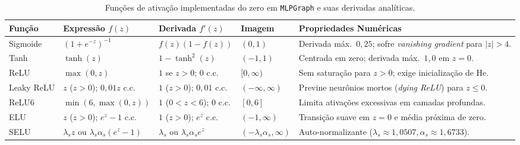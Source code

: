 \begin{table}[H]
\centering
\caption{Funções de ativação implementadas do zero em \texttt{MLPGraph} e suas derivadas analíticas.}
\label{tab:ativacoes}
\footnotesize
\begin{tabular}{llllp{5.8cm}}
\toprule
\textbf{Função} & \textbf{Expressão $f(z)$} & \textbf{Derivada $f'(z)$} & \textbf{Imagem} & \textbf{Propriedades Numéricas} \\
\midrule
Sigmoide & $(1 + e^{-z})^{-1}$ & $f(z)(1-f(z))$ & $(0,1)$ & Derivada máx.\ $0{,}25$; sofre \textit{vanishing gradient} para $|z|>4$. \\
Tanh & $\tanh(z)$ & $1 - \tanh^2(z)$ & $(-1,1)$ & Centrada em zero; derivada máx.\ $1{,}0$ em $z=0$. \\
ReLU & $\max(0,z)$ & $1$ se $z>0$; $0$ c.c. & $[0,\infty)$ & Sem saturação para $z>0$; exige inicialização de He. \\
Leaky ReLU & $z$ ($z>0$); $0{,}01z$ c.c. & $1$ ($z>0$); $0{,}01$ c.c. & $(-\infty,\infty)$ & Previne neurônios mortos (\textit{dying ReLU}) para $z\le 0$. \\
ReLU6 & $\min(6, \max(0,z))$ & $1$ ($0<z<6$); $0$ c.c. & $[0,6]$ & Limita ativações excessivas em camadas profundas. \\
ELU & $z$ ($z>0$); $e^z-1$ c.c. & $1$ ($z>0$); $e^z$ c.c. & $(-1,\infty)$ & Transição suave em $z=0$ e média próxima de zero. \\
SELU & $\lambda_s z$ ou $\lambda_s\alpha_s(e^z-1)$ & $\lambda_s$ ou $\lambda_s\alpha_s e^z$ & $(-\lambda_s\alpha_s,\infty)$ & Auto-normalizante ($\lambda_s\approx 1{,}0507, \alpha_s\approx 1{,}6733$). \\
\bottomrule
\end{tabular}
\end{table}

